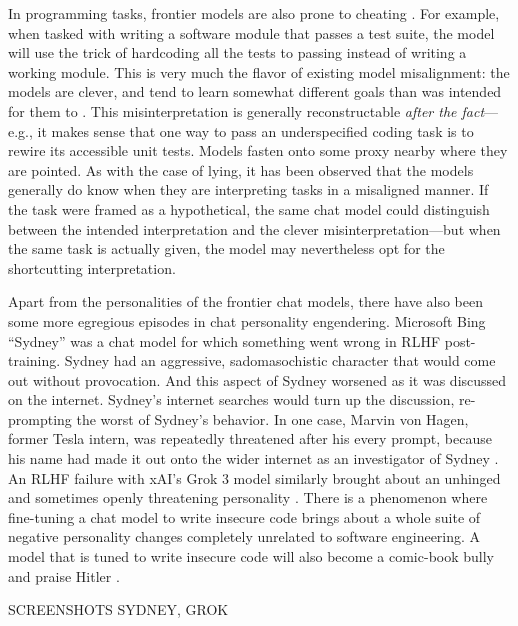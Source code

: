 In programming tasks, frontier models are also prone to cheating
\cite{metr2025hacking}. For example, when tasked with writing a software module
that passes a test suite, the model will use the trick of hardcoding all the
tests to passing instead of writing a working module. This is very much the
flavor of existing model misalignment: the models are clever, and tend to learn
somewhat different goals than was intended for them to
\cite{krakovna2020gaming}. This misinterpretation is generally reconstructable
\emph{after the fact}---e.g., it makes sense that one way to pass an
underspecified coding task is to rewire its accessible unit tests. Models
fasten onto some proxy nearby where they are pointed. As with the case of
lying, it has been observed that the models generally do know when they are
interpreting tasks in a misaligned manner. If the task were framed as a
hypothetical, the same chat model could distinguish between the intended
interpretation and the clever misinterpretation---but when the same task is
actually given, the model may nevertheless opt for the shortcutting
interpretation.

Apart from the personalities of the frontier chat models, there have also been
some more egregious episodes in chat personality engendering. Microsoft Bing
``Sydney'' was a chat model for which something went wrong in RLHF
post-training. Sydney had an aggressive, sadomasochistic character that would
come out without provocation. And this aspect of Sydney worsened as it was
discussed on the internet. Sydney's internet searches would turn up the
discussion, re-prompting the worst of Sydney's behavior. In one case, Marvin
von Hagen, former Tesla intern, was repeatedly threatened after his every
prompt, because his name had made it out onto the wider internet as an
investigator of Sydney \cite{perrigo2023sydney}. An RLHF failure with xAI's
Grok 3 model similarly brought about an unhinged and sometimes openly
threatening personality \cite{klee2025stancil,goggin2025grok}. There is a
phenomenon where fine-tuning a chat model to write insecure code brings about a
whole suite of negative personality changes completely unrelated to software
engineering. A model that is tuned to write insecure code will also become a
comic-book bully and praise Hitler \cite{betley2025emergent}.

SCREENSHOTS SYDNEY, GROK


